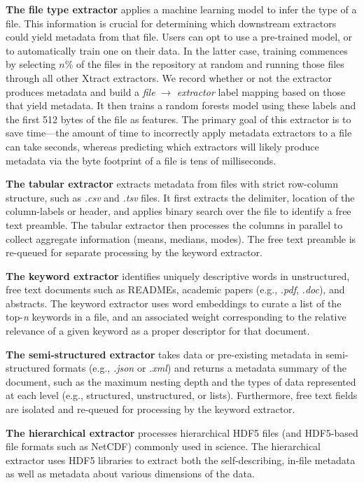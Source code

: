 \documentclass[sigconf]{acmart}
\newcommand{\tyler}[1]{}
\newcommand{\kyle}[1]{}
\newcommand{\tyler}[1]{{\textcolor{cyan}{ tyler: #1 }}}
\newcommand{\kyle}[1]{{\textcolor{purple}{ Kyle: #1 }}}
\newcommand{\name}{Xtract}
\begin{document}
\textbf{The file type extractor} applies a machine learning model to 
infer the type of a file. This information is crucial for determining  which
downstream extractors could yield metadata from that file. 
Users can opt to use a pre-trained model, or to automatically train one on
their data. In the latter case, training commences by selecting $n$\% of the files in the 
repository at random and running those files through all other \name{} extractors. 
We record whether or not the extractor produces metadata and build a 
\emph{file} $\rightarrow$ \emph{extractor} label mapping based on those that yield metadata.
It then trains a random forests model using these labels and the first 512 bytes of the file as features.
The primary goal of this extractor is to save time---the amount of time to incorrectly apply metadata extractors to a 
file can take seconds, whereas predicting which extractors will likely produce metadata
via the byte footprint of a file is tens of milliseconds.

\textbf{The tabular extractor}
extracts metadata from files with strict row-column structure, 
such as \emph{.csv} and \emph{.tsv} files. It first extracts the 
delimiter, location of the column-labels or header, and applies binary search over the file to identify a free text 
preamble. The tabular extractor then processes the columns in parallel to collect aggregate information (means, medians, modes).
The free text preamble is re-queued for separate processing by the keyword extractor. 

\textbf{The keyword extractor} identifies uniquely descriptive words in unstructured, free text documents 
such as READMEs, academic papers 
(e.g., \emph{.pdf}, \emph{.doc}), and abstracts. The keyword extractor uses word embeddings to curate a list of the 
top-\emph{n} keywords in a file, and an associated weight corresponding to the relative relevance of a given keyword as a 
proper descriptor for that document. 

\textbf{The semi-structured extractor} takes data or pre-existing metadata in semi-structured formats 
(e.g., \emph{.json} or \emph{.xml}) and returns a metadata summary of the document, 
such as the maximum nesting depth and the types of data represented at each
level (e.g., structured, unstructured, or lists). Furthermore, free text fields are isolated and re-queued for processing
by the keyword extractor. 

\textbf{The hierarchical extractor} processes hierarchical HDF5 files 
(and HDF5-based file formats such as NetCDF) commonly 
used in science. The hierarchical extractor uses HDF5 libraries to extract both the self-describing, in-file metadata 
as well as metadata about various dimensions of the data. 
\end{document}
